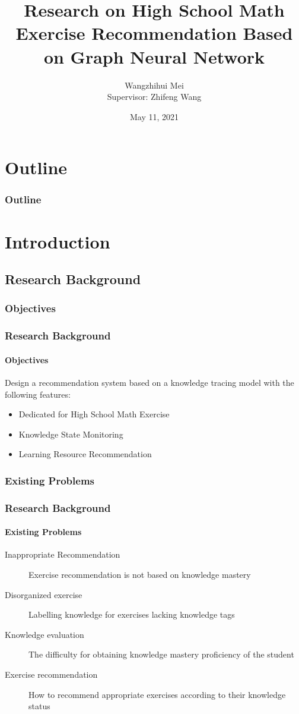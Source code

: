 \documentclass[10pt,aspectratio=43,mathserif]{beamer}
\title[Research on High School Math Exercise Recommendation Based on Graph Neural Network]{Research on High School Math Exercise Recommendation Based on Graph Neural Network}
\author[Wangzhihui Mei]{
  Wangzhihui Mei %
  \\\medskip
  Supervisor: Zhifeng Wang}
\institute[CCNU-UOW JI]{
  Central China Normal University Wollongong Joint Institute}
\date[\today]{May 11, 2021}
\begin{document}
\begin{frame}
	\titlepage
\end{frame}				%

\section{Outline}
\begin{frame}
	\frametitle{Outline}
	\tableofcontents
\end{frame}				%
\section{Introduction}
\subsection{Research Background}
\subsubsection{Objectives}
\begin{frame}
	\frametitle{Research Background}
	\framesubtitle{Objectives}
	Design a recommendation system based on a knowledge tracing model with the following features:
	\begin{itemize}
		\item Dedicated for High School Math Exercise
		\item Knowledge State Monitoring
		\item Learning Resource Recommendation
	\end{itemize}
\end{frame}

\subsubsection{Existing Problems}
\begin{frame}
	\frametitle{Research Background}
	\framesubtitle{Existing Problems}
	\begin{description}
		\item[Inappropriate Recommendation] Exercise recommendation is not based on knowledge mastery
		\item[Disorganized exercise] Labelling knowledge for exercises lacking knowledge tags
		\item[Knowledge evaluation] The difficulty for obtaining knowledge mastery proficiency of the student
		\item[Exercise recommendation] How to recommend appropriate exercises according to their knowledge status
	\end{description}
\end{frame}
\end{document}
